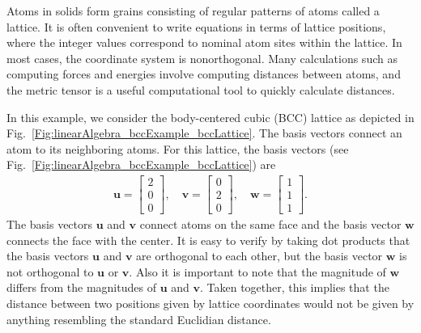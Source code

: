 Atoms in solids form grains consisting of regular patterns of atoms called a lattice. It is often convenient to write equations in terms of lattice positions, where the integer values correspond to nominal atom sites within the lattice. In most cases, the coordinate system is nonorthogonal. Many calculations such as computing forces and energies involve computing distances between atoms, and the metric tensor is a useful computational tool to quickly calculate distances.

In this example, we consider the body-centered cubic (BCC) lattice as depicted in Fig.~\ref{Fig:linearAlgebra_bccExample_bccLattice}. The basis vectors connect an atom to its neighboring atoms. For this lattice, the basis vectors (see Fig.~\ref{Fig:linearAlgebra_bccExample_bccLattice}) are
\begin{align}
  \mathbf{u} = \left[ \begin{array}{c} 2 \\ 0 \\ 0 \end{array} \right] , \quad 
  \mathbf{v} = \left[ \begin{array}{c} 0 \\ 2 \\ 0 \end{array} \right] , \quad
  \mathbf{w} = \left[ \begin{array}{c} 1 \\ 1 \\ 1 \end{array} \right] .
\end{align}
The basis vectors $\mathbf{u}$ and $\mathbf{v}$ connect atoms on the same face and the basis vector $\mathbf{w}$ connects the face with the center. It is easy to verify by taking dot products that the basis vectors $\mathbf{u}$ and $\mathbf{v}$ are orthogonal to each other, but the basis vector $\mathbf{w}$ is not orthogonal to $\mathbf{u}$ or $\mathbf{v}$. Also it is important to note that the magnitude of $\mathbf{w}$ differs from the magnitudes of $\mathbf{u}$ and $\mathbf{v}$. Taken together, this implies that the distance between two positions given by lattice coordinates would not be given by anything resembling the standard Euclidian distance.

